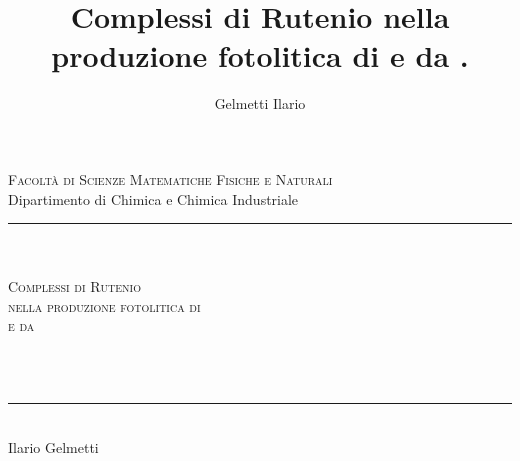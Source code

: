 \documentclass[a4paper, italian, twoside
, 12pt
]{article}
\title{Complessi di Rutenio nella produzione fotolitica di \ce{H2} e \ce{O2} da \ce{H2O}.}
\author{Gelmetti Ilario}
\date{}%
\begin{document}
\setcounter{errorcontextlines}{\maxdimen}

\begin{titlepage}

\begin{center}
   	\large{\textsc{Facoltà di Scienze Matematiche Fisiche e Naturali}}\\
   	\large{{Dipartimento di Chimica e Chimica Industriale}}\\
		\rule{5cm}{1pt}\\	
			\makebox[\textwidth]{\rule{0pt}{.22\textheight}}\\
	\LARGE{\textsc{Complessi di Rutenio\\nella produzione fotolitica di \\ e  da }}\\
	\bigskip	
		\makebox[.2\textwidth]{\rule{0pt}{.1\textheight}}\\
\end{center}

\vfill
\begin{small}
\makebox[\textwidth]{\rule{0pt}{.02\textheight}}\\
	\begin{center}
	\rule{3cm}{1pt}\\
	\LARGE{Ilario Gelmetti}\\		
	\end{center}
\end{small}

\end{titlepage}




\pagestyle{fancy}
\addtolength{\headwidth}{0.7cm}
\lhead[\fancyplain{}{\textbf{\footnotesize{\leftmark}}}]{}
\chead{}
\rhead[]{\fancyplain{}{\textbf{\footnotesize{\rightmark}}}}

\tableofcontents






\end{document}
